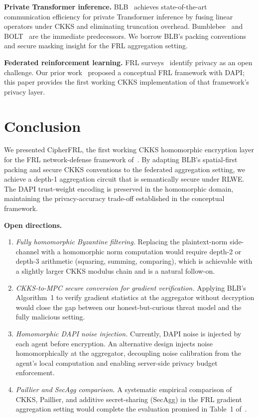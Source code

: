 \documentclass[letterpaper,journal]{IEEEtran}
\begin{document}
\textbf{Private Transformer inference.}
BLB~\cite{blb2025} achieves state-of-the-art communication efficiency for
private Transformer inference by fusing linear operators under CKKS and
eliminating truncation overhead.
Bumblebee~\cite{bumblebee2025} and BOLT~\cite{bolt2024} are the immediate
predecessors.
We borrow BLB's packing conventions and secure masking insight for the FRL
aggregation setting.

\textbf{Federated reinforcement learning.}
FRL surveys~\cite{chengu2024} identify privacy as an open challenge.
Our prior work~\cite{frlconf2026} proposed a conceptual FRL framework with
DAPI; this paper provides the first working CKKS implementation of that
framework's privacy layer.

\section{Conclusion}\label{sec:conclusion}

We presented CipherFRL, the first working CKKS homomorphic encryption layer
for the FRL network-defense framework of~\cite{frlconf2026}.
By adapting BLB's spatial-first packing and secure CKKS conventions to the
federated aggregation setting, we achieve a depth-1 aggregation circuit that
is semantically secure under RLWE.
The DAPI trust-weight encoding is preserved in the homomorphic domain,
maintaining the privacy-accuracy trade-off established in the conceptual
framework.

\textbf{Open directions.}
\begin{enumerate}
  \item \textit{Fully homomorphic Byzantine filtering.}
        Replacing the plaintext-norm side-channel with a homomorphic norm
        computation would require depth-2 or depth-3 arithmetic (squaring,
        summing, comparing), which is achievable with a slightly larger
        CKKS modulus chain and is a natural follow-on.
  \item \textit{CKKS-to-MPC secure conversion for gradient verification.}
        Applying BLB's Algorithm~1 to verify gradient statistics at the
        aggregator without decryption would close the gap between our
        honest-but-curious threat model and the fully malicious setting.
  \item \textit{Homomorphic DAPI noise injection.}
        Currently, DAPI noise is injected by each agent before encryption.
        An alternative design injects noise homomorphically at the
        aggregator, decoupling noise calibration from the agent's local
        computation and enabling server-side privacy budget enforcement.
  \item \textit{Paillier and SecAgg comparison.}
        A systematic empirical comparison of CKKS, Paillier, and
        additive secret-sharing (SecAgg) in the FRL gradient aggregation
        setting would complete the evaluation promised in Table~1
        of~\cite{frlconf2026}.
\end{enumerate}
\end{document}
